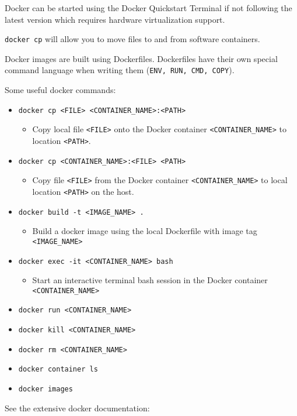 \documentclass{article}
\begin{document}
Docker can be started using the Docker Quickstart Terminal 
if not following the latest version which requires hardware virtualization support.

\texttt{docker cp} will allow you to move files
to and from software containers.

Docker images are built using Dockerfiles.
Dockerfiles have their own special command language when writing them (\texttt{ENV, RUN, CMD, COPY}).

Some useful docker commands:

\begin{itemize}
\item \texttt{docker cp <FILE> <CONTAINER\_NAME>:<PATH>}
\begin{itemize}
\item Copy local file \texttt{<FILE>} onto the Docker container \texttt{<CONTAINER\_NAME>} to location \texttt{<PATH>}.
\end{itemize}
\item \texttt{docker cp <CONTAINER\_NAME>:<FILE> <PATH>}
\begin{itemize}
\item Copy file \texttt{<FILE>} from the Docker container \texttt{<CONTAINER\_NAME>} to local location \texttt{<PATH>} on the host.
\end{itemize}
\item \texttt{docker build -t <IMAGE\_NAME> .}
\begin{itemize}
\item Build a docker image using the local Dockerfile with image tag \texttt{<IMAGE\_NAME>}
\end{itemize}
\item \texttt{docker exec -it <CONTAINER\_NAME> bash}
\begin{itemize}
\item Start an interactive terminal bash session in the Docker container \texttt{<CONTAINER\_NAME>}
\end{itemize}
\item \texttt{docker run <CONTAINER\_NAME>}
\item \texttt{docker kill <CONTAINER\_NAME>}
\item \texttt{docker rm <CONTAINER\_NAME>}
\item \texttt{docker container ls}
\item \texttt{docker images}
\end{itemize}

See the extensive docker documentation:
\end{document}
